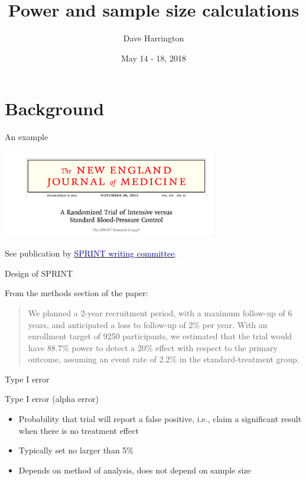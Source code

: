 \documentclass[ignorenonframetext,]{beamer}
\title{Power and sample size calculations}
\author{Dave Harrington}
\date{May 14 - 18, 2018}
\begin{document}
\frame{\titlepage}

\begin{frame}
\tableofcontents[hideallsubsections]
\end{frame}
\hypertarget{background}{%
\section{Background}\label{background}}

\begin{frame}{%
\protect\hypertarget{an-example}{%
An example}}

\includegraphics[width=0.7\textwidth,height=\textheight]{../figures/sprint.pdf}

See publication by
\href{../../clinical_papers/SPRINT_nejm.pdf}{\textcolor{darkblue}{SPRINT writing committee}}.

\end{frame}

\begin{frame}{%
\protect\hypertarget{design-of-sprint}{%
Design of SPRINT}}

From the methods section of the paper:

\vspace{2em}

\begin{quote}
We planned a 2-year recruitment period, with a maximum follow-up of 6 years, and anticipated a loss to follow-up of 2\% per year. With an enrollment target of 9250 participants, we estimated  that the trial would have 88.7\% power to detect  a 20\% effect with respect to the primary outcome, assuming an event rate of 2.2\% in the standard-treatment group.
\end{quote}

\end{frame}

\begin{frame}{%
\protect\hypertarget{type-i-error}{%
Type I error}}

Type I error (alpha error)

\begin{itemize}
\item
  Probability that trial will report a false positive, i.e., claim a
  significant result when there is no treatment effect
\item
  Typically set no larger than 5\%
\item
  Depends on method of analysis, does not depend on sample size
\end{itemize}

\end{frame}
\end{document}
